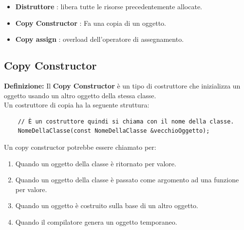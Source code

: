 \begin{itemize}
	\item \textsf{\small \textbf{Distruttore} : libera tutte le risorse precedentemente allocate.}
	\item \textsf{\small \textbf{Copy Constructor} : Fa una copia di un oggetto.}
	\item \textsf{\small \textbf{Copy assign} : overload dell'operatore di assegnamento.}
\end{itemize}

\subsection{Copy Constructor}

\textsf{\small \textbf{Definizione: } Il \textbf{Copy Constructor} è un tipo di costruttore che inizializza un oggetto usando un altro oggetto della stessa classe.} \\

\textsf{\small Un costruttore di copia ha la seguente struttura: } \\

\begin{lstlisting}
	// È un costruttore quindi si chiama con il nome della classe.
	NomeDellaClasse(const NomeDellaClasse &vecchioOggetto);
\end{lstlisting}

\textsf{\small Un copy constructor potrebbe essere chiamato per:}

\begin{enumerate}
	\item \textsf{\small Quando un oggetto della classe è ritornato per valore.}
	\item \textsf{\small Quando un oggetto della classe è passato come argomento ad una funzione per valore.}
	\item \textsf{\small Quando un oggetto è costruito sulla base di un altro oggetto.}
	\item \textsf{\small Quando il compilatore genera un oggetto temporaneo.}
\end{enumerate}

